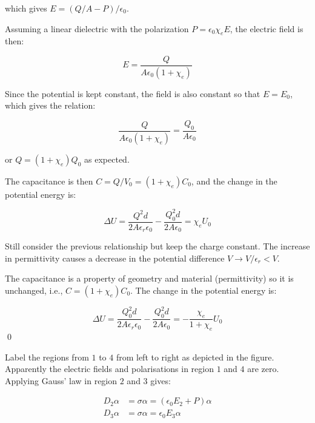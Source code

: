\documentclass[12pt]{article}
\begin{document}
which gives $E = (Q/A - P)/\epsilon_{0}$.

Assuming a linear dielectric with the polarization $P = \epsilon_{0} \chi_{e} E$, the electric field is then:

\begin{equation}
    E = \frac{Q}{A\epsilon_{0}(1 + \chi_{e})}
\end{equation}

Since the potential is kept constant, the field is also constant so that $E = E_{0}$, which gives the relation:

\begin{equation}
    \frac{Q}{A\epsilon_{0}(1 + \chi_{e})} = \frac{Q_{0}}{A\epsilon_{0}}
\end{equation}

or $Q = (1 + \chi_{e}) Q_{0}$ as expected.

The capacitance is then $C = Q/V_{0} = (1 + \chi_{e})C_{0}$, and the change in the potential energy is:

\begin{equation}
    \Delta U = \frac{Q^{2}d}{2A\epsilon_{r}\epsilon_{0}} - \frac{Q_{0}^{2}d}{2A\epsilon_{0}} = \chi_{e} U_{0}
\end{equation}

Still consider the previous relationship but keep the charge constant. The increase in permittivity causes a decrease in the potential difference $V \to V/\epsilon_{r} < V$.

The capacitance is a property of geometry and material (permittivity) so it is unchanged, i.e., $C = (1 + \chi_{e})C_{0}$. The change in the potential energy is:

\begin{equation}
    \Delta U = \frac{Q_{0}^{2}d}{2A\epsilon_{r}\epsilon_{0}} - \frac{Q_{0}^{2}d}{2A\epsilon_{0}} = -\frac{\chi_{e}}{1 + \chi_{e}} U_{0}
\end{equation}
\qed



Label the regions from $1$ to $4$ from left to right as depicted in the figure. Apparently the electric fields and polarisations in region $1$ and $4$ are zero. Applying Gauss' law in region $2$ and $3$ gives:

\begin{equation}
    \begin{split}
        D_{2} \alpha &= \sigma \alpha = (\epsilon_{0} E_{2} + P) \alpha \\
        D_{3} \alpha &= \sigma \alpha = \epsilon_{0} E_{3} \alpha
    \end{split}
\end{equation}
\end{document}
